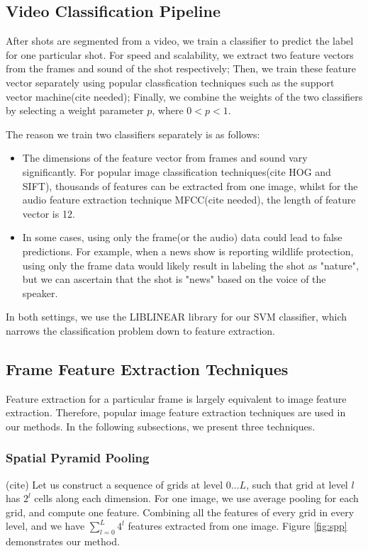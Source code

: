\documentclass{article}
\begin{document}
\subsection{Video Classification Pipeline}
After shots are segmented from a video, we train a classifier to predict the label for one particular shot. For speed and scalability, we extract two feature vectors from the frames and sound of the shot respectively; Then, we train these feature vector separately using popular classfication techniques such as the support vector machine(cite needed); Finally, we combine the weights of the two classifiers by selecting a weight parameter $p$, where $0 < p < 1$. \par
The reason we train two classifiers separately is as follows:
\begin{itemize}
\item The dimensions of the feature vector from frames and sound vary significantly. For popular image classification techniques(cite HOG and SIFT), thousands of features can be extracted from one image, whilst for the audio feature extraction technique MFCC(cite needed), the length of feature vector is 12.
\item In some cases, using only the frame(or the audio) data could lead to false predictions. For example, when a news show is reporting wildlife protection, using only the frame data would likely result in labeling the shot as "nature", but we can ascertain that the shot is "news" based on the voice of the speaker.
\end{itemize}
In both settings, we use the LIBLINEAR library for our SVM classifier, which narrows the classification problem down to feature extraction.
\subsection{Frame Feature Extraction Techniques}
Feature extraction for a particular frame is largely equivalent to image feature extraction. Therefore, popular image feature extraction techniques are used in our methods. In the following subsections, we present three techniques.
\subsubsection{Spatial Pyramid Pooling}(cite)
Let us construct a sequence of grids at level $0 \ldots L$, such that grid at level $l$ has $2^l$ cells along each dimension. For one image, we use average pooling for each grid, and compute one feature. Combining all the features of every grid in every level, and we have $\sum_{l=0}^{L} 4^l$ features extracted from one image. Figure \ref{fig:spp} demonstrates our method.
\end{document}
